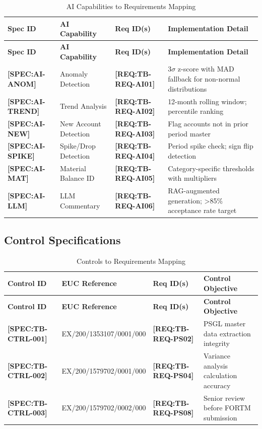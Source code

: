 \documentclass[11pt,a4paper]{article}
\newcommand{\reqref}[1]{\textcolor{reqpurple}{\textbf{[REQ:#1]}}}
\newcommand{\specref}[1]{\textcolor{specblue}{\textbf{[SPEC:#1]}}}
\begin{document}
\begin{longtable}{@{}C{2cm}L{3.5cm}C{2.5cm}L{5.5cm}@{}}
\caption{AI Capabilities to Requirements Mapping} \\
\toprule
\textbf{Spec ID} & \textbf{AI Capability} & \textbf{Req ID(s)} & \textbf{Implementation Detail} \\
\midrule
\endfirsthead
\toprule
\textbf{Spec ID} & \textbf{AI Capability} & \textbf{Req ID(s)} & \textbf{Implementation Detail} \\
\midrule
\endhead
\specref{AI-ANOM} & Anomaly Detection & \reqref{TB-REQ-AI01} & 3$\sigma$ z-score with MAD fallback for non-normal distributions \\
\specref{AI-TREND} & Trend Analysis & \reqref{TB-REQ-AI02} & 12-month rolling window; percentile ranking \\
\specref{AI-NEW} & New Account Detection & \reqref{TB-REQ-AI03} & Flag accounts not in prior period master \\
\specref{AI-SPIKE} & Spike/Drop Detection & \reqref{TB-REQ-AI04} & Period spike check; sign flip detection \\
\specref{AI-MAT} & Material Balance ID & \reqref{TB-REQ-AI05} & Category-specific thresholds with multipliers \\
\specref{AI-LLM} & LLM Commentary & \reqref{TB-REQ-AI06} & RAG-augmented generation; >85\% acceptance rate target \\
\bottomrule
\end{longtable}

\subsection{Control Specifications}

\begin{longtable}{@{}C{2.5cm}L{4cm}C{2.5cm}L{4.5cm}@{}}
\caption{Controls to Requirements Mapping} \\
\toprule
\textbf{Control ID} & \textbf{EUC Reference} & \textbf{Req ID(s)} & \textbf{Control Objective} \\
\midrule
\endfirsthead
\toprule
\textbf{Control ID} & \textbf{EUC Reference} & \textbf{Req ID(s)} & \textbf{Control Objective} \\
\midrule
\endhead
\specref{TB-CTRL-001} & EX/200/1353107/0001/000 & \reqref{TB-REQ-PS02} & PSGL master data extraction integrity \\
\specref{TB-CTRL-002} & EX/200/1579702/0001/000 & \reqref{TB-REQ-PS04} & Variance analysis calculation accuracy \\
\specref{TB-CTRL-003} & EX/200/1579702/0002/000 & \reqref{TB-REQ-PS08} & Senior review before FORTM submission \\
\bottomrule
\end{longtable}
\end{document}

